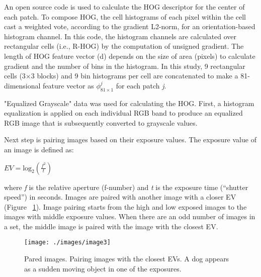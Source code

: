 \documentclass[preprint,12pt,3p]{elsarticle}
\begin{document}
An open source code \cite{16} is used to calculate the HOG descriptor for the center of each patch. To compose HOG, the cell histograms of each pixel within the cell cast a weighted vote, according to the gradient L2-norm, for an orientation-based histogram channel. In this code, the histogram channels are calculated over rectangular cells (i.e., R-HOG) by the computation of unsigned gradient. The length of HOG feature vector (d) depends on the size of area (pixels) to calculate gradient and the number of bins in the histogram. In this study, 9 rectangular cells (3$\times$3 blocks) and 9 bin histograms per cell are concatenated to make a 81-dimensional feature vector as $\phi^{j}_{81\times1}$ for each patch \textit{j}.

"Equalized Grayscale" data was used for calculating the HOG. First, a histogram equalization \cite{15} is applied on each individual RGB band to produce an equalized RGB image that is subsequently converted to grayscale values.


Next step is pairing images based on their exposure values. The exposure value of an image is defined as:
\begin{center}
$EV={\mathrm{log}}_{2}(\frac{{f}^{2}}{t})$
\end{center}
where \textit{f} is the relative aperture (f-number) and \textit{t} is the exposure time (“shutter speed”) in seconds. Images are paired with another image with a closer EV (Figure ~\ref{fig:pair}).   Image pairing starts from the high and low exposed images to the images with middle exposure values.  When there are an odd number of images in a set, the middle image is paired with the image with the closest EV.

\begin{figure}[t]
\centering
\texttt{[image: ./images/image3]}
\caption{Pared images. Pairing images with the closest EVs. A dog appears as a sudden moving object in one of the exposures. }
\label{fig:pair}
\end{figure}

%
%
%
\end{document}
